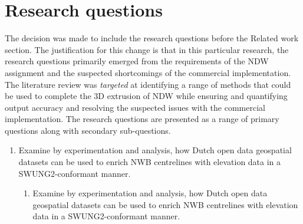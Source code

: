 
\chapter{Research questions}
\label{chap:rq}

The decision was made to include the research questions before the Related work section. The justification for this change is that in this particular research, the research questions primarily emerged from the requirements of the NDW assignment and the suspected shortcomings of the commercial implementation. The literature review was \textit{targeted} at identifying a range of methods that could be used to complete the 3D extrusion of NDW while ensuring and quantifying output accuracy and resolving the suspected issues with the commercial implementation. The research questions are presented as a range of primary questions along with secondary sub-questions.

\renewcommand{\labelenumii}{\Roman{enumii}}
\begin{enumerate}
\item Examine by experimentation and analysis, how Dutch open data geospatial datasets can be used to enrich NWB centrelines with elevation data in a SWUNG2-conformant manner.
\begin{enumerate}
\item Examine by experimentation and analysis, how Dutch open data geospatial datasets can be used to enrich NWB centrelines with elevation data in a SWUNG2-conformant manner.
\end{enumerate}
\end{enumerate}